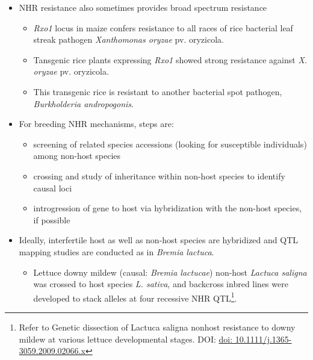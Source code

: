 \documentclass[11pt,dvipsnames,ignorenonframetext,aspectratio=169]{beamer}
\providecommand{\tightlist}{%
  \setlength{\itemsep}{0pt}\setlength{\parskip}{0pt}}
\begin{document}
\begin{frame}{}
\protect\hypertarget{section-15}{}
\small

\begin{itemize}
\tightlist
\item
  NHR resistance also sometimes provides broad spectrum resistance

  \begin{itemize}
  \footnotesize
  \item \textit{Rxo1} locus in maize confers resistance to all races of rice bacterial leaf streak pathogen \textit{Xanthomonas oryzae} pv. {oryzicola}.
  \item Tansgenic rice plants expressing \textit{Rxo1} showed strong resistance against \textit{X. oryzae} pv. {oryzicola}.
  \item This transgenic rice is resistant to another bacterial spot pathogen, \textit{Burkholderia andropogonis}.
  \end{itemize}
\item
  For breeding NHR mechanisms, steps are:

  \begin{itemize}
  \footnotesize
  \item screening of related species accessions (looking for susceptible individuals) among non-host species
  \item crossing and study of inheritance within non-host species to identify causal loci
  \item introgression of gene to host via hybridization with the non-host species, if possible
  \end{itemize}
\end{itemize}

\footnotesize

\begin{itemize}
\tightlist
\item
  Ideally, interfertile host as well as non-host species are hybridized
  and QTL mapping studies are conducted as in \textit{Bremia lactuca}.

  \begin{itemize}
  \scriptsize
  \item Lettuce downy mildew (causal: \textit{Bremia lactucae}) non-host \textit{Lactuca saligna} was crossed to host species \textit{L. sativa}, and backcross inbred lines were developed to stack alleles at four recessive NHR QTL\footnote[frame]{Refer to Genetic dissection of Lactuca saligna nonhost resistance to downy mildew at various lettuce developmental stages. DOI: \url{doi: 10.1111/j.1365-3059.2009.02066.x}}.
  \end{itemize}
\end{itemize}
\end{frame}
\end{document}
